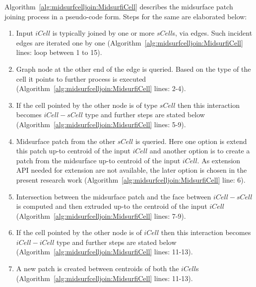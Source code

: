 
Algorithm~\ref{alg:midsurfcelljoin:MidsurfiCell} describes the midsurface patch joining process in a pseudo-code form. Steps for the same are elaborated below:

\begin{enumerate}
[noitemsep,topsep=2pt,parsep=2pt,partopsep=2pt]
\item Input $iCell$ is typically joined by one or more $sCell$s, via edges. Such incident edges are iterated one by one (Algorithm~\ref{alg:midsurfcelljoin:MidsurfiCell} lines: loop between 1 to 15).
\item Graph node at the other end of the edge is queried. Based on the type of the cell it points to further process is executed (Algorithm~\ref{alg:midsurfcelljoin:MidsurfiCell} lines: 2-4).
\item If the cell pointed by the other node is of type $sCell$ then this interaction becomes $iCell-sCell$ type and further steps are stated below (Algorithm~\ref{alg:midsurfcelljoin:MidsurfiCell} lines: 5-9).
\item Midsurface patch from the other $sCell$ is queried. Here one option is extend this patch up-to centroid of the input $iCell$ and another option is to create a patch from the midsurface up-to centroid of the input $iCell$. As extension API needed for extension are not available, the later option is chosen in the present research work (Algorithm~\ref{alg:midsurfcelljoin:MidsurfiCell} line: 6).
\item Intersection between the midsurface patch and the face between $iCell-sCell$ is computed and then extruded up-to the centroid of the input $iCell$ (Algorithm~\ref{alg:midsurfcelljoin:MidsurfiCell} lines: 7-9).
\item If the cell pointed by the other node is of $iCell$ then this interaction becomes $iCell-iCell$ type and further steps are stated below (Algorithm~\ref{alg:midsurfcelljoin:MidsurfiCell} lines: 11-13).
\item A new patch is created between centroids of both the $iCell$s (Algorithm~\ref{alg:midsurfcelljoin:MidsurfiCell} lines: 11-13).
\end{enumerate}


